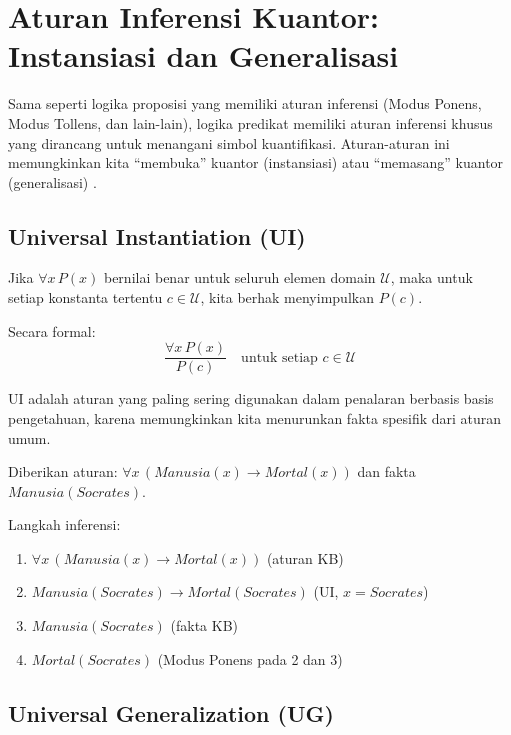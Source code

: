\section{Aturan Inferensi Kuantor: Instansiasi dan Generalisasi}

Sama seperti logika proposisi yang memiliki aturan inferensi (Modus Ponens, Modus Tollens, dan lain-lain), logika predikat memiliki aturan inferensi khusus yang dirancang untuk menangani simbol kuantifikasi. Aturan-aturan ini memungkinkan kita ``membuka'' kuantor (instansiasi) atau ``memasang'' kuantor (generalisasi) \cite{rosen2019}.

\subsection{Universal Instantiation (UI)}

\begin{definisi}
Jika $\forall x\, P(x)$ bernilai benar untuk seluruh elemen domain $\mathcal{U}$, maka untuk setiap konstanta tertentu $c \in \mathcal{U}$, kita berhak menyimpulkan $P(c)$.

Secara formal:
\[ \frac{\forall x\, P(x)}{P(c)} \quad \text{untuk setiap } c \in \mathcal{U} \]
\end{definisi}

UI adalah aturan yang paling sering digunakan dalam penalaran berbasis basis pengetahuan, karena memungkinkan kita menurunkan fakta spesifik dari aturan umum.

\begin{contoh}
Diberikan aturan: $\forall x\, (Manusia(x) \rightarrow Mortal(x))$ dan fakta $Manusia(Socrates)$.

Langkah inferensi:
\begin{enumerate}
    \item $\forall x\, (Manusia(x) \rightarrow Mortal(x))$ \hfill (aturan KB)
    \item $Manusia(Socrates) \rightarrow Mortal(Socrates)$ \hfill (UI, $x = Socrates$)
    \item $Manusia(Socrates)$ \hfill (fakta KB)
    \item $Mortal(Socrates)$ \hfill (Modus Ponens pada 2 dan 3)
\end{enumerate}
\end{contoh}

\subsection{Universal Generalization (UG)}

